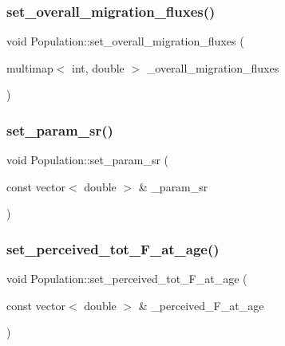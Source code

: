 \mbox{\label{class_population_a73f27952336c2f075a51f6be3c48e9ae}} 
\subsubsection{\texorpdfstring{set\_overall\_migration\_fluxes()}{set\_overall\_migration\_fluxes()}}
{\footnotesize\ttfamily void Population\+::set\+\_\+overall\+\_\+migration\+\_\+fluxes (\begin{DoxyParamCaption}\item[{multimap$<$ int, double $>$}]{\+\_\+overall\+\_\+migration\+\_\+fluxes }\end{DoxyParamCaption})}

\mbox{\label{class_population_a1053e532a1864da186cf4e7648dbe969}} 
\subsubsection{\texorpdfstring{set\_param\_sr()}{set\_param\_sr()}}
{\footnotesize\ttfamily void Population\+::set\+\_\+param\+\_\+sr (\begin{DoxyParamCaption}\item[{const vector$<$ double $>$ \&}]{\+\_\+param\+\_\+sr }\end{DoxyParamCaption})}

\mbox{\label{class_population_a406395c451553a74cb8057b522b92dba}} 
\subsubsection{\texorpdfstring{set\_perceived\_tot\_F\_at\_age()}{set\_perceived\_tot\_F\_at\_age()}}
{\footnotesize\ttfamily void Population\+::set\+\_\+perceived\+\_\+tot\+\_\+\+F\+\_\+at\+\_\+age (\begin{DoxyParamCaption}\item[{const vector$<$ double $>$ \&}]{\+\_\+perceived\+\_\+\+F\+\_\+at\+\_\+age }\end{DoxyParamCaption})}

